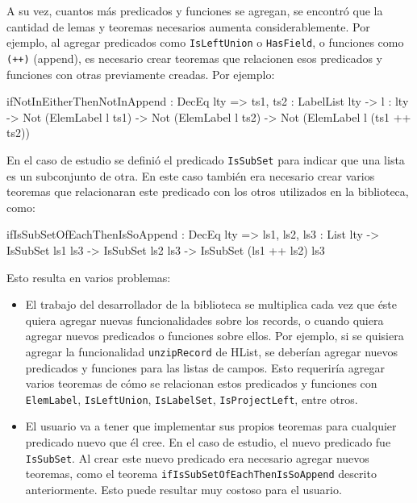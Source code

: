 A su vez, cuantos más predicados y funciones se agregan, se encontró que la cantidad de lemas y teoremas necesarios aumenta considerablemente. Por ejemplo, al agregar predicados como \texttt{IsLeftUnion} o \texttt{HasField}, o funciones como \texttt{(++)} (append), es necesario crear teoremas que relacionen esos predicados y funciones con otras previamente creadas. Por ejemplo:

\begin{code}
ifNotInEitherThenNotInAppend : DecEq lty =>
  {ts1, ts2 : LabelList lty} -> {l : lty} ->
  Not (ElemLabel l ts1) -> Not (ElemLabel l ts2) ->
  Not (ElemLabel l (ts1 ++ ts2))
\end{code}

En el caso de estudio se definió el predicado \texttt{IsSubSet} para indicar que una lista es un subconjunto de otra. En este caso también era necesario crear varios teoremas que relacionaran este predicado con los otros utilizados en la biblioteca, como:

\begin{code}
ifIsSubSetOfEachThenIsSoAppend : DecEq lty =>
  {ls1, ls2, ls3 : List lty} ->
  IsSubSet ls1 ls3 -> IsSubSet ls2 ls3 ->
  IsSubSet (ls1 ++ ls2) ls3
\end{code}

Esto resulta en varios problemas:

\begin{itemize}
\item El trabajo del desarrollador de la biblioteca se multiplica cada vez que éste quiera agregar nuevas funcionalidades sobre los records, o cuando quiera agregar nuevos predicados o funciones sobre ellos. Por ejemplo, si se quisiera agregar la funcionalidad \texttt{unzipRecord} de HList, se deberían agregar nuevos predicados y funciones para las listas de campos. Esto requeriría agregar varios teoremas de cómo se relacionan estos predicados y funciones con \texttt{ElemLabel}, \texttt{IsLeftUnion}, \texttt{IsLabelSet}, \texttt{IsProjectLeft}, entre otros.
\item El usuario va a tener que implementar sus propios teoremas para cualquier predicado nuevo que él cree. En el caso de estudio, el nuevo predicado fue \texttt{IsSubSet}. Al crear este nuevo predicado era necesario agregar nuevos teoremas, como el teorema \texttt{ifIsSubSetOfEachThenIsSoAppend} descrito anteriormente. Esto puede resultar muy costoso para el usuario.
\end{itemize}

